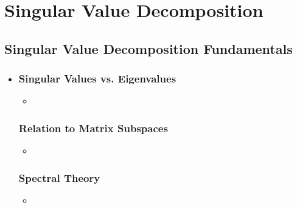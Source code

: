 \chapter{Singular Value Decomposition}\label{Singular Value Decomposition}

\section{Singular Value Decomposition Fundamentals}\label{Singular Value Decomposition Fundamentals}
\begin{itemize}
  \item []
  
  \subsection{Singular Values vs. Eigenvalues}\label{Singular Values vs. Eigenvalues}
  \begin{itemize}
    \item 
  \end{itemize}

  \subsection{Relation to Matrix Subspaces}\label{SVD Relation to Subspaces}
  \begin{itemize}
    \item 
  \end{itemize}

  \subsection{Spectral Theory}\label{Spectral Theory}
  \begin{itemize}
    \item 
  \end{itemize}
  
\end{itemize}


